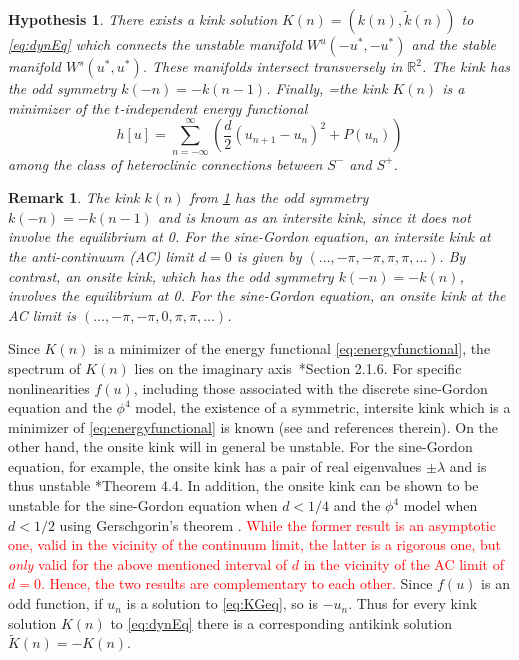 \documentclass[12pt,reqno]{amsart}
\def\R{{\mathbb R}}
\newtheorem{hypothesis}{Hypothesis}
\newtheorem{remark}{Remark}
\newcommand{\revised}[1]{ \textcolor{red}{#1} }
\begin{document}
\begin{hypothesis}\label{hyp:kinkexists}
There exists a kink solution $K(n) = (k(n),\tilde{k}(n))$ to \cref{eq:dynEq} which connects the unstable manifold $W^u(-u^*, -u^*)$ and the stable manifold $W^s(u^*, u^*)$. These manifolds intersect transversely in $\R^2$. 
The kink has the odd symmetry $k(-n) = -k(n-1)$. Finally, 
=the kink $K(n)$ is a minimizer of the $t$-independent energy functional
\begin{equation}\label{eq:energyfunctional}
h[u] = \sum_{n=-\infty}^\infty 
\left( \frac{d}{2} (u_{n+1} - u_n)^2 + P(u_n) \right)
\end{equation}
{among the class of heteroclinic connections between $S^-$ and $S^+$.}
\end{hypothesis}

\begin{remark}
The kink $k(n)$ from \cref{hyp:kinkexists} has the odd symmetry $k(-n) = -k(n-1)$ and is known as an intersite kink, since it does not involve the equilibrium at 0. For the sine-Gordon equation, an intersite kink at the anti-continuum (AC) limit 
{$d = 0$} is given by $(\dots, -\pi, -\pi, \pi, \pi, \dots)$. By contrast, an onsite kink, which has the odd symmetry $k(-n) = -k(n)$, involves the equilibrium at 0. For the sine-Gordon equation, an onsite kink at the AC limit is $(\dots, -\pi, -\pi, 0, \pi, \pi, \dots)$. 
\end{remark}

Since $K(n)$ is a minimizer of the energy functional \cref{eq:energyfunctional}, the spectrum of $K(n)$ lies on the imaginary axis~\cite{KevrekidisWeinstein2000}*{Section 2.1.6}.
For specific nonlinearities $f(u)$, including those associated with the discrete sine-Gordon equation and the $\phi^4$ model, the existence of a symmetric, intersite kink which is a minimizer of \cref{eq:energyfunctional} is known (see \cites{KevrekidisWeinstein2000,SGchapter} and references therein). On the other
hand, the onsite kink will in general be unstable. For the sine-Gordon equation, for example, the onsite kink has a pair of real eigenvalues $\pm \lambda$ and is thus unstable \cite{Kapitula2001}*{Theorem 4.4}. In addition, the onsite kink can be shown to be unstable for the sine-Gordon equation when $d < 1/4$ and the  $\phi^4$ model when $d < 1/2$ using Gerschgorin’s theorem \cite{SGchapter}. 
\revised{While the former result is an asymptotic one, valid
in the vicinity of the continuum limit, the latter is a
rigorous one, but {\it only} valid for the above mentioned
interval of $d$ in the vicinity of the AC limit
of $d=0$. Hence, the two results are complementary to each other.}
Since $f(u)$ is an odd function, if $u_n$ is a solution to \cref{eq:KGeq}, so is $-u_n$. Thus for every kink solution $K(n)$ to \cref{eq:dynEq} there is a corresponding antikink solution $\tilde{K}(n) = -K(n)$.
\end{document}
